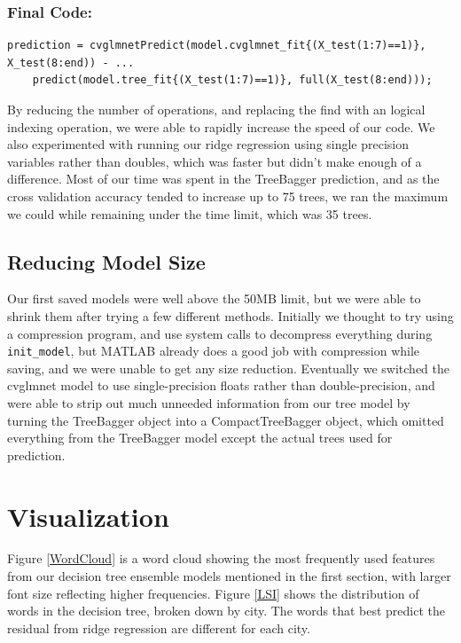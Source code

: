 \documentclass[11pt]{article}
\begin{document}
\subsubsection*{Final Code:}
\begin{lstlisting}
prediction = cvglmnetPredict(model.cvglmnet_fit{(X_test(1:7)==1)}, X_test(8:end)) - ...
	predict(model.tree_fit{(X_test(1:7)==1)}, full(X_test(8:end)));
\end{lstlisting}

By reducing the number of operations, and replacing the find with an logical indexing operation, we were able to rapidly increase the speed of our code. We also experimented with running our ridge regression using single precision variables rather than doubles, which was faster but didn't make enough of a difference. Most of our time was spent in the TreeBagger prediction, and as the cross validation accuracy tended to increase up to 75 trees, we ran the maximum we could while remaining under the time limit, which was 35 trees.

\subsection{Reducing Model Size}
Our first saved models were well above the 50MB limit, but we were able to shrink them after trying a few different methods. Initially we thought to try using a compression program, and use system calls to decompress everything during \texttt{init\_model}, but MATLAB already does a good job with compression while saving, and we were unable to get any size reduction. Eventually we switched the cvglmnet model to use single-precision floats rather than double-precision, and were able to strip out much unneeded information from our tree model by turning the TreeBagger object into a CompactTreeBagger object, which omitted everything from the TreeBagger model except the actual trees used for prediction. 

\section{Visualization}
Figure \ref{WordCloud} is a word cloud showing the most frequently used features from our decision tree ensemble models mentioned in the first section, with larger font size reflecting higher frequencies. Figure \ref{LSI} shows the distribution of words in the decision tree, broken down by city. The words that best predict the residual from ridge regression are different for each city.
\end{document}

